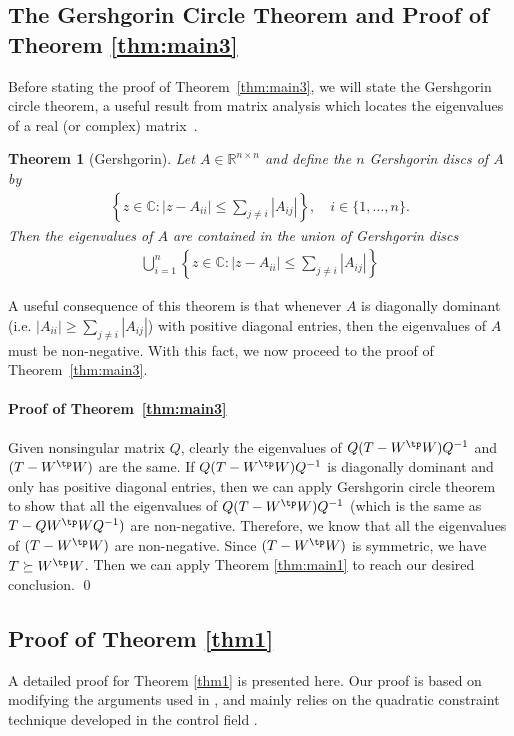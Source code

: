 \documentclass{article} \usepackage{iclr2023_conference,times}
\newtheorem{theorem}{Theorem}
\newcommand{\0}{\mathbf{0} }
\begin{document}
\subsection{The Gershgorin Circle Theorem and Proof of Theorem \ref{thm:main3}}
Before stating the proof of Theorem~\ref{thm:main3}, we will state the Gershgorin circle theorem, a useful result from matrix analysis which locates the eigenvalues of a real (or complex) matrix~\cite[Theorem 6.1.1]{horn2012matrix}.
\begin{theorem}[Gershgorin]
Let $A \in \mathbb{R}^{n\times n}$ and define the $n$ Gershgorin discs of $A$ by
\begin{align*}
    \left\{z \in \mathbb{C}: |z-A_{ii}| \leq \sum_{j\neq i}|A_{ij} | \right\},\quad i \in \{1,\ldots, n\}.
\end{align*}
Then the eigenvalues of $A$ are contained in the union of Gershgorin discs
\begin{align*}
  \bigcup_{i=1}^n \left\{z \in \mathbb{C}: |z-A_{ii}| \leq \sum_{j\neq i}|A_{ij} | \right\}
\end{align*}
\end{theorem}
A useful consequence of this theorem is that whenever $A$ is diagonally dominant (i.e. $|A_{ii}| \geq \sum_{j\neq i}|A_{ij}|$) with positive diagonal entries, then the eigenvalues of $A$ must be non-negative. With this fact, we now proceed to the proof of Theorem~\ref{thm:main3}.
\paragraph{Proof of Theorem~\ref{thm:main3}}
Given  nonsingular matrix $Q$, clearly the eigenvalues of $Q(T-W^\tp W)Q^{-1}$ and $(T-W^\tp W)$ are the same. 
If $Q(T-W^\tp W)Q^{-1}$ is diagonally dominant and only has positive diagonal entries, then we can apply Gershgorin circle theorem \cite[Corollary 6.1.6]{horn2012matrix}  to show that
all the eigenvalues of $Q(T-W^\tp W) Q^{-1}$ (which is the same as $T-QW^\tp W Q^{-1})$ are non-negative. Therefore, we know that all the eigenvalues of $(T-W^\tp W)$ are non-negative. Since $(T-W^\tp W)$ is symmetric, we have $T\succeq W^\tp W$. Then we can apply Theorem \ref{thm:main1} to reach our desired conclusion.
\qed


\subsection{Proof of Theorem \ref{thm1}}

A detailed proof for Theorem \ref{thm1} is presented here. Our proof is based on modifying the arguments used in \cite[Theorem 1]{fazlyab2019efficient}, and mainly relies on the quadratic constraint technique developed in the control field \citep{Megretski1997}.
\end{document}
